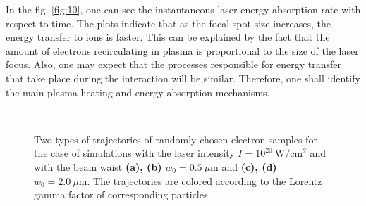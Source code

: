 In the fig. \ref{fig:10}, one can see the instantaneous laser energy absorption rate with respect to time. The plots indicate that as the focal spot size increases, the energy transfer to ions is faster. This can be explained by the fact that the amount of electrons recirculating in plasma is proportional to the size of the laser focus. Also, one may expect that the processes responsible for energy transfer that take place during the interaction will be similar. Therefore, one shall identify the main plasma heating and energy absorption mechanisms.

\begin{figure}[h!]
	\centering
	\\[2mm]
	\caption{Two types of trajectories of randomly chosen electron samples for the case of simulations with the laser intensity $ I = 10^{20} \ \mathrm{W/cm^2} $ and with the beam waist \textbf{(a), (b)} $ w_0 = 0.5 \ \mu\mathrm{m} $ and \textbf{(c), (d)} $ w_0 = 2.0 \ \mu\mathrm{m} $. The trajectories are colored according to the Lorentz gamma factor of corresponding particles.}
	\label{fig:19}
\end{figure}

